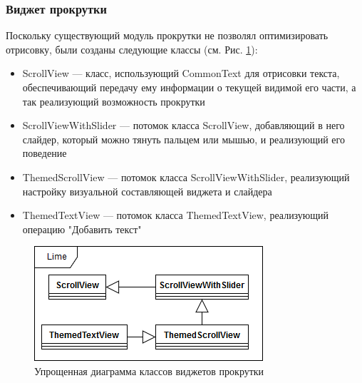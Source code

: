 \documentclass{fefu}
\begin{document}
			\subsubsection{Виджет прокрутки}
				\par Поскольку существующий модуль прокрутки не позволял оптимизировать
				отрисовку, были созданы следующие классы (см. Рис. \ref{diag:ScrollView}):
				\begin{itemize}
					\item ScrollView --- класс, использующий CommonText для отрисовки текста,
					обеспечивающий передачу ему информации о текущей видимой его части, а так
					реализующий возможность прокрутки
					\item ScrollViewWithSlider --- потомок класса ScrollView, добавляющий в 
					него слайдер, который можно тянуть пальцем или мышью, и реализующий его
					поведение
					\item ThemedScrollView --- потомок класса ScrollViewWithSlider,
					реализующий настройку визуальной составляющей виджета и слайдера
					\item ThemedTextView --- потомок класса ThemedTextView, реализующий 
					операцию "Добавить текст"
				\end{itemize}
				\begin{figure}[H]
					\centering
					\includegraphics[width=1\linewidth]{diagrams/ScrollView.png}
					\caption{Упрощенная диаграмма классов виджетов прокрутки}
					\label{diag:ScrollView}
				\end{figure}
\end{document}
